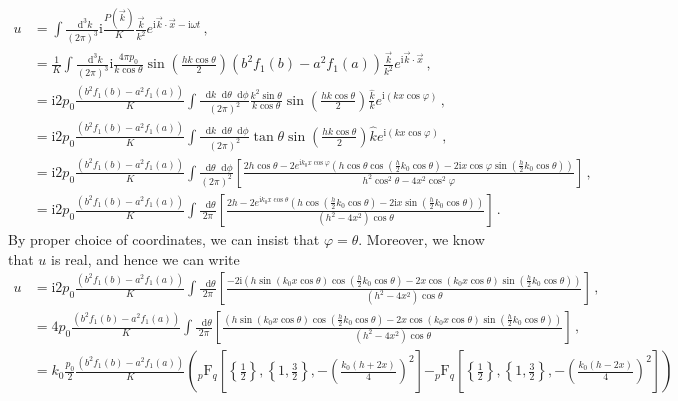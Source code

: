 \documentclass{article}
\newcommand*\diff{\mathop{}\!\mathrm{d}}
\newcommand*\te[1]{\text{#1}}
\newcommand*\p[1]{\left(#1\right)}
\newcommand*\ps[1]{\left[#1\right]}
\newcommand*\pc[1]{\left\{#1\right\}}
\newcommand*\f[2]{\frac{#1}{#2}}
\newcommand*\I{\te{i}}
\begin{document}
\begin{align}
u &= \int\f{\diff^3 k}{(2\pi)^3}\I\f{P(\vec k)}{K}\f{\vec k}{k^2}e^{\I \vec k\cdot\vec x - \I\omega t}\,,\\
&=\f{1}{K}\int\f{\diff^3 k}{(2\pi)^3}\I\f{4\pi p_0}{k\cos\theta}\sin\p{\f{h k\cos\theta}{2}}(b^2f_1(b)-a^2f_1(a))\f{\vec k}{k^2}e^{\I \vec k\cdot\vec x}\,,\\
&=\I2 p_0\f{(b^2f_1(b)-a^2f_1(a))}{K}\int\f{\diff k\diff\theta\diff\phi}{(2\pi)^2}\f{k^2\sin\theta}{k\cos\theta}\sin\p{\f{h k\cos\theta}{2}}\f{\hat k}{k}e^{\I (kx\cos\varphi)}\,,\\
&=\I2 p_0\f{(b^2f_1(b)-a^2f_1(a))}{K}\int\f{\diff k\diff\theta\diff\phi}{(2\pi)^2}\tan\theta\sin\p{\f{h k\cos\theta}{2}}\hat k e^{\I (kx\cos\varphi)}\,,\\
&=\I2 p_0\f{(b^2f_1(b)-a^2f_1(a))}{K}\int\f{\diff\theta\diff\phi}{(2\pi)^2}\ps{\f{2h\cos\theta-2e^{\I k_0 x\cos\varphi}\p{h\cos\theta\cos\p{\f{h}{2}k_0\cos\theta} - 2\I x\cos\varphi\sin\p{\f{h}{2}k_0\cos\theta}}}{h^2\cos^2\theta-4x^2\cos^2\varphi}}\,,\\
&=\I2 p_0\f{(b^2f_1(b)-a^2f_1(a))}{K}\int\f{\diff\theta}{2\pi}\ps{\f{2h-2e^{\I k_0 x\cos\theta}\p{h\cos\p{\f{h}{2}k_0\cos\theta} - 2\I x\sin\p{\f{h}{2}k_0\cos\theta}}}{(h^2-4x^2)\cos\theta}}\,.
\end{align}
By proper choice of coordinates, we can insist that $\varphi = \theta$. Moreover, we know that $u$ is real, and hence we can write
\begin{align}
u &=\I2 p_0\f{(b^2f_1(b)-a^2f_1(a))}{K}\int\f{\diff\theta}{2\pi}\ps{\f{-2\I\p{h\sin\p{k_0 x\cos\theta}\cos\p{\f{h}{2}k_0\cos\theta} - 2 x\cos\p{k_0 x\cos\theta}\sin\p{\f{h}{2}k_0\cos\theta}}}{(h^2-4x^2)\cos\theta}}\,,\\
&=4 p_0\f{(b^2f_1(b)-a^2f_1(a))}{K}\int\f{\diff\theta}{2\pi}\ps{\f{\p{h\sin\p{k_0 x\cos\theta}\cos\p{\f{h}{2}k_0\cos\theta} - 2 x\cos\p{k_0 x\cos\theta}\sin\p{\f{h}{2}k_0\cos\theta}}}{(h^2-4x^2)\cos\theta}}\,,\\
&=k_0\f{p_0}{2}\f{(b^2f_1(b)-a^2f_1(a))}{K}\p{_p\te{F}_q\ps{\pc{\f12},\pc{1,\f32},-\p{\f{k_0(h+2x)}{4}}^2} -_p\te{F}_q\ps{\pc{\f12},\pc{1,\f32},-\p{\f{k_0(h-2x)}{4}}^2}}
\end{align}
\end{document}
